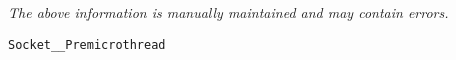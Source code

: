 \label{pkg:socket\_\_premicrothread}

{\tiny \it The above information is manually maintained and may contain errors.}
\begin{verbatim}
Socket__Premicrothread
\end{verbatim}
